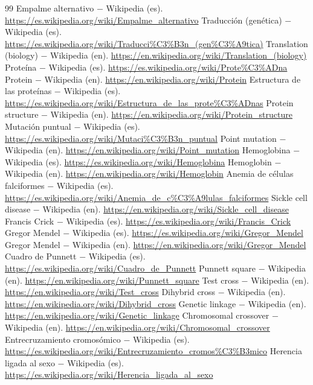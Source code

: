 \documentclass{book}
\begin{document}
\begin{thebibliography}{99}
 Empalme alternativo \(-\) Wikipedia (es). \url{https://es.wikipedia.org/wiki/Empalme_alternativo}
 Traducción (genética) \(-\) Wikipedia (es). \url{https://es.wikipedia.org/wiki/Traducci%C3%B3n_(gen%C3%A9tica)}
 Translation (biology) \(-\) Wikipedia (en). \url{https://en.wikipedia.org/wiki/Translation_(biology)}
 Proteína \(-\) Wikipedia (es). \url{https://es.wikipedia.org/wiki/Prote%C3%ADna}
 Protein \(-\) Wikipedia (en). \url{https://en.wikipedia.org/wiki/Protein}
 Estructura de las proteínas \(-\) Wikipedia (es). \url{https://es.wikipedia.org/wiki/Estructura_de_las_prote%C3%ADnas}
 Protein structure \(-\) Wikipedia (en). \url{https://en.wikipedia.org/wiki/Protein_structure}
 Mutación puntual \(-\) Wikipedia (es). \url{https://es.wikipedia.org/wiki/Mutaci%C3%B3n_puntual}
 Point mutation \(-\) Wikipedia (en). \url{https://en.wikipedia.org/wiki/Point_mutation}
 Hemoglobina \(-\) Wikipedia (es). \url{https://es.wikipedia.org/wiki/Hemoglobina}
 Hemoglobin \(-\) Wikipedia (en). \url{https://en.wikipedia.org/wiki/Hemoglobin}
 Anemia de células falciformes \(-\) Wikipedia (es). \url{https://es.wikipedia.org/wiki/Anemia_de_c%C3%A9lulas_falciformes}
 Sickle cell disease \(-\) Wikipedia (en). \url{https://en.wikipedia.org/wiki/Sickle_cell_disease}
 Francis Crick \(-\) Wikipedia (es). \url{https://es.wikipedia.org/wiki/Francis_Crick}
 Gregor Mendel \(-\) Wikipedia (es). \url{https://es.wikipedia.org/wiki/Gregor_Mendel}
 Gregor Mendel \(-\) Wikipedia (en). \url{https://en.wikipedia.org/wiki/Gregor_Mendel}
 Cuadro de Punnett \(-\) Wikipedia (es). \url{https://es.wikipedia.org/wiki/Cuadro_de_Punnett}
 Punnett square \(-\) Wikipedia (en). \url{https://en.wikipedia.org/wiki/Punnett_square}
 Test cross \(-\) Wikipedia (en). \url{https://en.wikipedia.org/wiki/Test_cross}
 Dihybrid cross \(-\) Wikipedia (en). \url{https://en.wikipedia.org/wiki/Dihybrid_cross}
 Genetic linkage \(-\) Wikipedia (en). \url{https://en.wikipedia.org/wiki/Genetic_linkage}
 Chromosomal crossover \(-\) Wikipedia (en). \url{https://en.wikipedia.org/wiki/Chromosomal_crossover}
 Entrecruzamiento cromosómico \(-\) Wikipedia (es). \url{https://es.wikipedia.org/wiki/Entrecruzamiento_cromos%C3%B3mico}
 Herencia ligada al sexo \(-\) Wikipedia (es). \url{https://es.wikipedia.org/wiki/Herencia_ligada_al_sexo}

\end{thebibliography}
\end{document}
